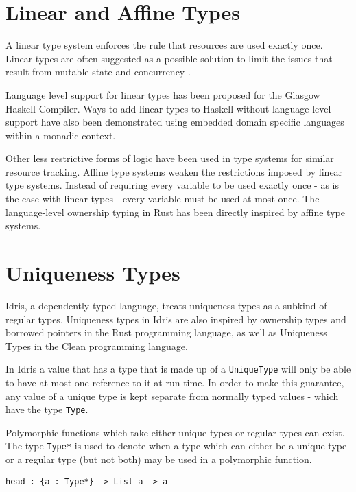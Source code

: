 \documentclass[onehalf,11pt]{beavtex}
\begin{document}
\section{Linear and Affine Types}

A linear type system enforces the rule that resources are used exactly once.
Linear types are often suggested as a possible solution to limit the issues that
result from mutable state \cite{Wadler90lineartypes} and concurrency
\cite{caires2010session}.

Language level support for linear types has been proposed for the Glasgow
Haskell Compiler\cite{LinearTypesGHC}.
Ways to add linear types to Haskell without language level support have also
been demonstrated using embedded domain specific languages within a monadic
context\cite{Paykin:2017:LM:3122955.3122965}. 

Other less restrictive forms of logic have been used in type systems for similar
resource tracking.
Affine type systems weaken the restrictions imposed by linear type systems.
Instead of requiring every variable to be used exactly once - as is the case
with linear types - every variable must be used at most once.
The language-level ownership typing in Rust has been directly inspired by affine
type systems.


\section{Uniqueness Types}

Idris, a dependently typed language, treats uniqueness types as a subkind of
regular types. Uniqueness types in Idris are also inspired by ownership types
and borrowed pointers in the Rust programming language, as well as Uniqueness
Types in the Clean programming language. %

In Idris a value that has a type that is made up of a \texttt{UniqueType}
will only be able to have at most one reference to it at run-time.
In order to make this guarantee, any value of a unique type is kept separate
from normally typed values - which have the type \texttt{Type}.

Polymorphic functions which take either unique types or regular
types can exist.
The type \texttt{Type*} is used to denote when a type which can either be a
unique type or a regular type (but not both) may be used in a polymorphic
function.

\begin{verbatim}
head : {a : Type*} -> List a -> a
\end{verbatim}
\end{document}
